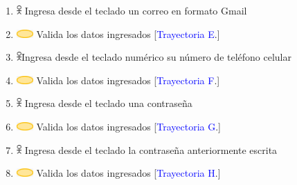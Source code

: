 \begin{enumerate}
                       \item \includegraphics[width=0.0150\textwidth]{Figuras/persona.png} Ingresa desde el teclado un correo en formato Gmail 
                       \item \includegraphics[width=0.0500\textwidth]{Figuras/sistema.png} Valida los datos ingresados [\textcolor{blue}{Trayectoria E}.]

                       \item \includegraphics[width=0.0150\textwidth]{Figuras/persona.png}Ingresa desde el teclado numérico su número de teléfono celular
                       \item \includegraphics[width=0.0500\textwidth]{Figuras/sistema.png} Valida los datos ingresados [\textcolor{blue}{Trayectoria F}.]
                       
                       \item \includegraphics[width=0.0150\textwidth]{Figuras/persona.png} Ingresa desde el teclado una contraseña
                       \item \includegraphics[width=0.0500\textwidth]{Figuras/sistema.png} Valida los datos ingresados [\textcolor{blue}{Trayectoria G}.]

                       \item \includegraphics[width=0.0150\textwidth]{Figuras/persona.png} Ingresa desde el teclado la contraseña anteriormente escrita
                       \item \includegraphics[width=0.0500\textwidth]{Figuras/sistema.png} Valida los datos ingresados [\textcolor{blue}{Trayectoria H}.]


\end{enumerate}
